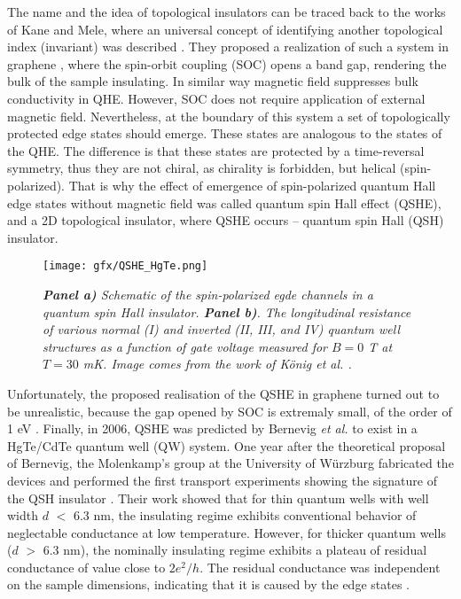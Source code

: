 \documentclass[titlepage,a4paper]{book}
\begin{document}
The name and the idea of topological insulators can be traced back to the works of Kane and Mele, where an universal concept of identifying another topological index (invariant) was described \cite{Kane_Topology2}. They proposed a realization of such a system in graphene \cite{Kane_Topology}, where the spin-orbit coupling (SOC) opens a band gap, rendering the bulk of the sample insulating. In similar way magnetic field suppresses bulk conductivity in QHE. However, SOC does not require application of external magnetic field. Nevertheless, at the boundary of this system a set of topologically protected edge states should emerge. These states are analogous to the states of the QHE. The difference is that these states are protected by a time-reversal symmetry, thus they are not chiral, as chirality is forbidden, but helical (spin-polarized). That is why the effect of emergence of spin-polarized quantum Hall edge states without magnetic field was called quantum spin Hall effect (QSHE), and a 2D topological insulator, where QSHE occurs -- quantum spin Hall (QSH) insulator.

\begin{figure}[ht]
	\centering
	\texttt{[image: gfx/QSHE\_HgTe.png]}
	\vspace{-10pt}
	\caption{\textit{\textbf{Panel a)} Schematic of the spin-polarized egde channels in a quantum spin Hall insulator. \textbf{Panel b)}. The longitudinal resistance of various normal (I) and inverted (II, III, and IV) quantum well structures as a function of gate voltage measured for $B = 0$ T at $T = 30$ mK. Image comes from the work of König \textit{et al.} \cite{Konig_Topology}.}}
	\label{fig:QSHE_HgTe}
\end{figure} 

Unfortunately, the proposed realisation of the QSHE in graphene turned out to be unrealistic, because the gap opened by SOC is extremaly small, of the order of 1 \textmu eV \cite{Yao_Topology}\cite{Min_Topology}. Finally, in 2006, QSHE was predicted by Bernevig \textit{et al.} \cite{Bernevig_Topology2}\cite{Bernevig_Topology1} to exist in a HgTe/CdTe quantum well (QW) system. One year after the theoretical proposal of Bernevig, the Molenkamp's group at the University of Würzburg fabricated the devices and performed the first transport experiments showing the signature of the QSH insulator \cite{Konig_Topology}. Their work showed that for thin quantum wells with well width $d$ $<$ 6.3 nm, the insulating regime exhibits conventional behavior of neglectable conductance at low temperature. However, for thicker quantum wells ($d$ $>$ 6.3 nm), the nominally insulating regime exhibits a plateau of residual conductance of value close to $2e^2/h$. The residual conductance was independent on the sample dimensions, indicating that it is caused by the edge states \cite{Konig_Topology}. 
\end{document}
